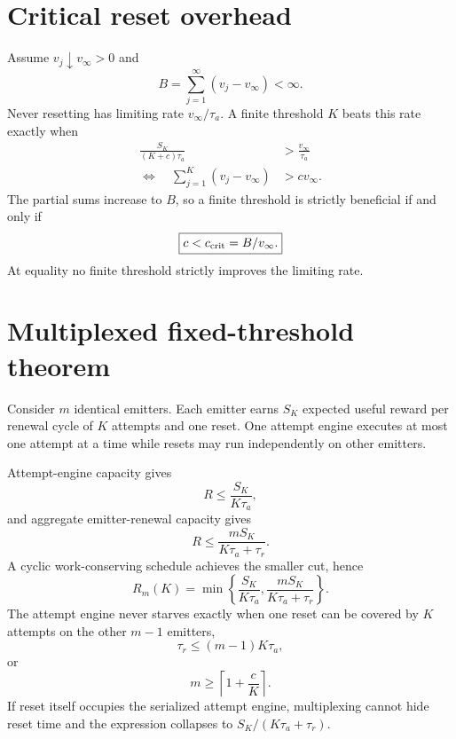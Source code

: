 \documentclass[aps,prx,preprint,superscriptaddress,nofootinbib,longbibliography]{revtex4-2}
\begin{document}
\section{Critical reset overhead}
Assume $v_j\downarrow v_\infty>0$ and
\begin{equation}
 B=\sum_{j=1}^{\infty}(v_j-v_\infty)<\infty.
\end{equation}
Never resetting has limiting rate $v_\infty/\tau_a$. A finite threshold $K$ beats this rate exactly when
\begin{align}
 \frac{S_K}{(K+c)\tau_a}&>\frac{v_\infty}{\tau_a}\\
 \Longleftrightarrow\quad
 \sum_{j=1}^{K}(v_j-v_\infty)&>cv_\infty.
\end{align}
The partial sums increase to $B$, so a finite threshold is strictly beneficial if and only if
\begin{equation}
 \boxed{c<c_{\rm crit}=B/v_\infty.}
\end{equation}
At equality no finite threshold strictly improves the limiting rate.

\section{Multiplexed fixed-threshold theorem}
Consider $m$ identical emitters. Each emitter earns $S_K$ expected useful reward per renewal cycle of $K$ attempts and one reset. One attempt engine executes at most one attempt at a time while resets may run independently on other emitters.

Attempt-engine capacity gives
\begin{equation}
 R\le \frac{S_K}{K\tau_a},
\end{equation}
and aggregate emitter-renewal capacity gives
\begin{equation}
 R\le\frac{mS_K}{K\tau_a+\tau_r}.
\end{equation}
A cyclic work-conserving schedule achieves the smaller cut, hence
\begin{equation}
 \boxed{R_m(K)=\min\left\{\frac{S_K}{K\tau_a},\frac{mS_K}{K\tau_a+\tau_r}\right\}.}
\end{equation}
The attempt engine never starves exactly when one reset can be covered by $K$ attempts on the other $m-1$ emitters,
\begin{equation}
 \tau_r\le(m-1)K\tau_a,
\end{equation}
or
\begin{equation}
 m\ge\left\lceil1+\frac{c}{K}\right\rceil.
\end{equation}
If reset itself occupies the serialized attempt engine, multiplexing cannot hide reset time and the expression collapses to $S_K/(K\tau_a+\tau_r)$.
\end{document}
